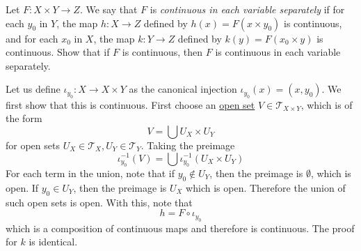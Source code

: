   \begin{exercise}[Munkres 18.11]
    Let $F : X \times Y \to Z$. We say that $F$ is \emph{continuous in each variable separately} if for each $y_0$ in $Y$, the map $h : X \to Z$ defined by $h(x) = F(x \times y_0)$ is continuous, and for each $x_0$ in $X$, the map $k : Y \to Z$ defined by $k(y) = F(x_0 \times y)$ is continuous. Show that if $F$ is continuous, then $F$ is continuous in each variable separately.
  \end{exercise}
  \begin{solution}
    Let us define $\iota_{y_0}: X \rightarrow X \times Y$ as the canonical injection $\iota_{y_0}(x) = (x, y_0)$. We first show that this is continuous. First choose an \hyperref[def:open-set]{open set} $V \in \mathscr{T}_{X \times Y}$, which is of the form 
    \begin{equation}
      V = \bigcup U_X \times U_Y
    \end{equation}
    for open sets $U_X \in \mathscr{T}_X, U_Y \in \mathscr{T}_Y$. Taking the preimage 
    \begin{equation}
      \iota_{y_0}^{-1} (V) = \bigcup \iota_{y_0}^{-1} (U_X \times U_Y)
    \end{equation}
    For each term in the union, note that if $y_0 \not\in U_Y$, then the preimage is $\emptyset$, which is open. If $y_0 \in U_Y$, then the preimage is $U_X$ which is open. Therefore the union of such open sets is open. With this, note that 
    \begin{equation}
      h = F \circ \iota_{y_0}
    \end{equation}
    which is a composition of continuous maps and therefore is continuous. The proof for $k$ is identical. 
  \end{solution}

